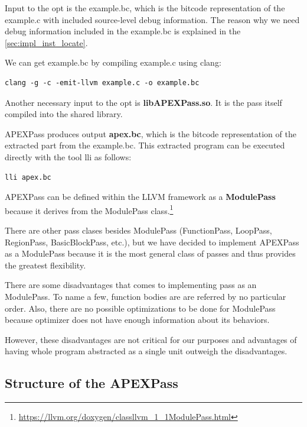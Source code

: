 \documentclass[12pt, twoside]{fithesis2}
\renewcommand{\_}{\leavevmode \kern0.07em\vbox{\hrule width0.4em}}
\begin{document}
Input to the opt is the example.bc, which is the bitcode representation of the
example.c with included source-level debug information. The reason why we need
debug information included in the example.bc is explained in the
\autoref{sec:impl_inst_locate}.

We can get example.bc by compiling example.c using clang:

\begin{verbatim}
clang -g -c -emit-llvm example.c -o example.bc
\end{verbatim}

Another necessary input to the opt is \textbf{libAPEXPass.so}. It is the pass
itself compiled into the shared library.

APEXPass produces output \textbf{apex.bc}, which is the bitcode representation
of the extracted part from the example.bc.
This extracted program can be executed directly with the tool lli as follows:

\begin{verbatim}
lli apex.bc
\end{verbatim}

APEXPass can be defined within the LLVM framework as a \textbf{ModulePass}
because it derives from the ModulePass class.\footnote{
\url{https://llvm.org/doxygen/classllvm_1_1ModulePass.html}
}

There are other pass clases besides ModulePass (FunctionPass, LoopPass,
RegionPass, BasicBlockPass, etc.), but we have decided to implement APEXPass as
a ModulePass because it is the most general class of passes and thus provides
the greatest flexibility.

There are some disadvantages that comes to implementing pass as an ModulePass.
To name a few, function bodies are are referred by no particular order.
Also, there are no possible
optimizations to be done for ModulePass because optimizer does not have enough
information about its behaviors. \cite{llvm-module-pass}

However, these disadvantages are not critical for our purposes and advantages
of having whole program abstracted as a single unit outweigh the disadvantages.

\subsection{Structure of the APEXPass}
\end{document}
